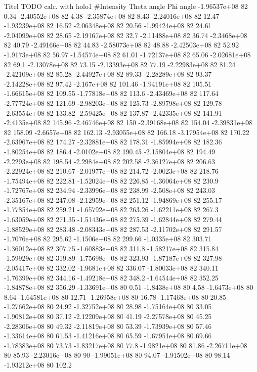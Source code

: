 Titel TODO
calc. with holo1
#Intensity    Theta angle    Phi angle
-1.96537e+08 82 0.34
-2.40552e+08 82 4.38
-2.35874e+08 82 8.43
-2.24016e+08 82 12.47
-1.93239e+08 82 16.52
-2.06348e+08 82 20.56
-1.99424e+08 82 24.61
-2.04099e+08 82 28.65
-2.19167e+08 82 32.7
-2.11488e+08 82 36.74
-2.3468e+08 82 40.79
-2.49166e+08 82 44.83
-2.58073e+08 82 48.88
-2.42503e+08 82 52.92
-1.9173e+08 82 56.97
-1.54574e+08 82 61.01
-1.72137e+08 82 65.06
-2.02681e+08 82 69.1
-2.13078e+08 82 73.15
-2.13393e+08 82 77.19
-2.22983e+08 82 81.24
-2.42109e+08 82 85.28
-2.44927e+08 82 89.33
-2.28289e+08 82 93.37
-2.14228e+08 82 97.42
-2.167e+08 82 101.46
-1.94191e+08 82 105.51
-1.66615e+08 82 109.55
-1.77818e+08 82 113.6
-2.43469e+08 82 117.64
-2.77724e+08 82 121.69
-2.98203e+08 82 125.73
-2.89798e+08 82 129.78
-2.63554e+08 82 133.82
-2.59425e+08 82 137.87
-2.42335e+08 82 141.91
-2.4135e+08 82 145.96
-2.46746e+08 82 150
-2.39168e+08 82 154.04
-2.39831e+08 82 158.09
-2.6657e+08 82 162.13
-2.93055e+08 82 166.18
-3.17954e+08 82 170.22
-2.63967e+08 82 174.27
-2.32881e+08 82 178.31
-1.85994e+08 82 182.36
-1.80254e+08 82 186.4
-2.0102e+08 82 190.45
-2.15804e+08 82 194.49
-2.2293e+08 82 198.54
-2.2984e+08 82 202.58
-2.36127e+08 82 206.63
-2.22924e+08 82 210.67
-2.01977e+08 82 214.72
-2.0023e+08 82 218.76
-1.75494e+08 82 222.81
-1.52024e+08 82 226.85
-1.36064e+08 82 230.9
-1.72767e+08 82 234.94
-2.33996e+08 82 238.99
-2.508e+08 82 243.03
-2.35167e+08 82 247.08
-2.12959e+08 82 251.12
-1.94869e+08 82 255.17
-1.77854e+08 82 259.21
-1.65792e+08 82 263.26
-1.62211e+08 82 267.3
-1.63059e+08 82 271.35
-1.51436e+08 82 275.39
-1.62844e+08 82 279.44
-1.88529e+08 82 283.48
-2.08343e+08 82 287.53
-2.11702e+08 82 291.57
-1.7076e+08 82 295.62
-1.1506e+08 82 299.66
-1.0335e+08 82 303.71
-1.36012e+08 82 307.75
-1.60883e+08 82 311.8
-1.58217e+08 82 315.84
-1.59929e+08 82 319.89
-1.75698e+08 82 323.93
-1.87187e+08 82 327.98
-2.05417e+08 82 332.02
-1.9681e+08 82 336.07
-1.80033e+08 82 340.11
-1.76399e+08 82 344.16
-1.49218e+08 82 348.2
-1.64544e+08 82 352.25
-1.84878e+08 82 356.29
-1.33691e+08 80 0.51
-1.8438e+08 80 4.58
-1.6473e+08 80 8.64
-1.64581e+08 80 12.71
-1.26958e+08 80 16.78
-1.17468e+08 80 20.85
-1.27662e+08 80 24.92
-1.32752e+08 80 28.98
-1.75164e+08 80 33.05
-1.90812e+08 80 37.12
-2.12209e+08 80 41.19
-2.27578e+08 80 45.25
-2.28306e+08 80 49.32
-2.11819e+08 80 53.39
-1.73939e+08 80 57.46
-1.33614e+08 80 61.53
-1.41216e+08 80 65.59
-1.67951e+08 80 69.66
-1.78383e+08 80 73.73
-1.83217e+08 80 77.8
-1.9821e+08 80 81.86
-2.26711e+08 80 85.93
-2.23016e+08 80 90
-1.99051e+08 80 94.07
-1.91502e+08 80 98.14
-1.93212e+08 80 102.2
